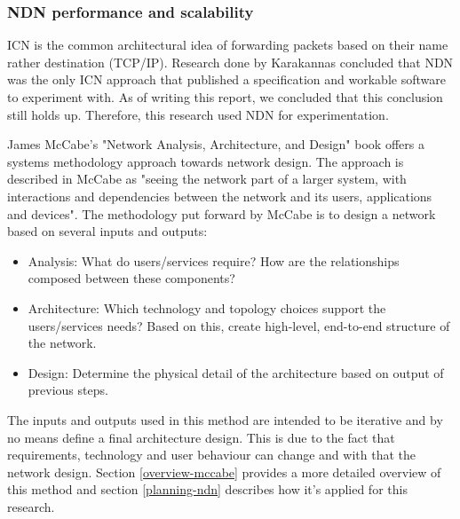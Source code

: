 \subsubsection{NDN performance and scalability}
\label{introduction-related-work-ndn}
ICN is the common architectural idea of forwarding packets based on their name rather destination (TCP/IP). Research done by Karakannas \cite{icn-bd} concluded that NDN was the only ICN approach that published a specification and workable software to experiment with. As of writing this report, we concluded that this conclusion still holds up. Therefore, this research used NDN for experimentation.

James McCabe's "Network Analysis, Architecture, and Design" \cite{mccabe2010network} book offers a systems methodology approach towards network design. The approach is described in McCabe as "seeing the network part of a larger system, with interactions and dependencies between the network and its users, applications and devices". The methodology put forward by McCabe is to design a network based on several inputs and outputs:
\begin{itemize}
    \item Analysis: What do users/services require? How are the relationships composed between these components?
    \item Architecture: Which technology and topology choices support the users/services needs? Based on this, create high-level, end-to-end structure of the network.
    \item Design: Determine the physical detail of the architecture based on output of previous steps.
\end{itemize}

The inputs and outputs used in this method are intended to be iterative and by no means define a final architecture design. This is due to the fact that requirements, technology and user behaviour can change and with that the network design. Section \ref{overview-mccabe} provides a more detailed overview of this method and section \ref{planning-ndn} describes how it's applied for this research.

